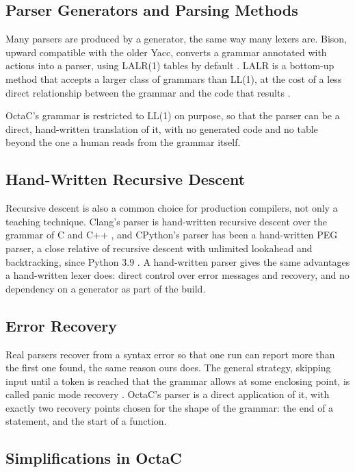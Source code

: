 \subsection{Parser Generators and Parsing Methods}

Many parsers are produced by a generator, the same way many lexers are.
Bison, upward compatible with the older Yacc, converts a grammar annotated
with actions into a parser, using LALR(1) tables by default
\cite{bison-manual}. LALR is a bottom-up method that accepts a larger class
of grammars than LL(1), at the cost of a less direct relationship between
the grammar and the code that results \cite{aho2006compilers}.

OctaC's grammar is restricted to LL(1) on purpose, so that the parser can
be a direct, hand-written translation of it, with no generated code and no
table beyond the one a human reads from the grammar itself.

\subsection{Hand-Written Recursive Descent}

Recursive descent is also a common choice for production compilers, not
only a teaching technique. Clang's parser is hand-written recursive
descent over the grammar of C and C++ \cite{clang-internals}, and CPython's
parser has been a hand-written PEG parser, a close relative of recursive
descent with unlimited lookahead and backtracking, since Python 3.9
\cite{python-pep617}. A hand-written parser gives the same advantages a
hand-written lexer does: direct control over error messages and recovery,
and no dependency on a generator as part of the build.

\subsection{Error Recovery}

Real parsers recover from a syntax error so that one run can report more
than the first one found, the same reason ours does. The general strategy,
skipping input until a token is reached that the grammar allows at some
enclosing point, is called panic mode recovery \cite{aho2006compilers}.
OctaC's parser is a direct application of it, with exactly two recovery
points chosen for the shape of the grammar: the end of a statement, and
the start of a function.

\subsection{Simplifications in OctaC}

